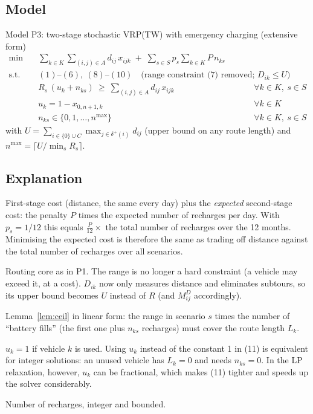 \documentclass[11pt,a4paper]{article}
\theoremstyle{definition}
\newcommand{\dout}{\delta^{+}}
\newcommand{\sumk}{\sum_{k\in K}}
\newcommand{\sumA}{\sum_{(i,j)\in A}}
\begin{document}
\subsection{Model}
\begin{modelbox}{Model P3: two-stage stochastic VRP(TW) with emergency charging (extensive form)}
\begin{align*}
\min\quad & \sumk\sumA d_{ij}\,x_{ijk}\;+\;\sum_{s\in S}p_s\sumk P\,n_{ks} \tag{0$'$}\\[3pt]
\text{s.t.}\quad
& (1)\text{--}(6),\ (8)\text{--}(10)\quad\text{(range constraint (7) removed; } D_{ik}\le U)\\
& R_s\,(u_k+n_{ks})\ \ge\ \sumA d_{ij}\,x_{ijk} && \forall k\in K,\ s\in S \tag{11}\\
& u_k = 1-x_{0,n+1,k} && \forall k\in K \tag{12}\\
& n_{ks}\in\{0,1,\dots,n^{\max}\} && \forall k\in K,\ s\in S \tag{13}
\end{align*}
with $U=\sum_{i\in\{0\}\cup C}\max_{j\in\dout(i)}d_{ij}$ (upper bound on any route length) and $n^{\max}=\lceil U/\min_s R_s\rceil$.
\end{modelbox}

\subsection{Explanation}
\begin{description}[leftmargin=1.1cm,style=sameline,font=\normalfont\bfseries]
\item[(0$'$)] First-stage cost (distance, the same every day) plus the \emph{expected} second-stage cost: the penalty $P$ times the expected number of recharges per day. With $p_s=1/12$ this equals $\frac{P}{12}\times$ the total number of recharges over the 12 months. Minimising the expected cost is therefore the same as trading off distance against the total number of recharges over all scenarios.
\item[(1)--(6), (8)--(10)] Routing core as in P1. The range is no longer a hard constraint (a vehicle may exceed it, at a cost). $D_{ik}$ now only measures distance and eliminates subtours, so its upper bound becomes $U$ instead of $R$ (and $M^D_{ij}$ accordingly).
\item[(11)] Lemma~\ref{lem:ceil} in linear form: the range in scenario $s$ times the number of ``battery fills'' (the first one plus $n_{ks}$ recharges) must cover the route length $L_k$.
\item[(12)] $u_k=1$ if vehicle $k$ is used. Using $u_k$ instead of the constant 1 in (11) is equivalent for integer solutions: an unused vehicle has $L_k=0$ and needs $n_{ks}=0$. In the LP relaxation, however, $u_k$ can be fractional, which makes (11) tighter and speeds up the solver considerably.
\item[(13)] Number of recharges, integer and bounded.
\end{description}
\end{document}
